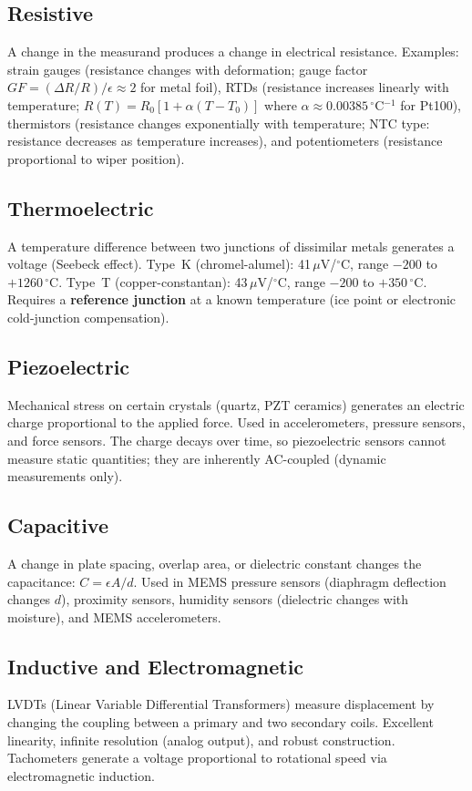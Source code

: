 \documentclass[11pt,letterpaper,twoside,openany]{book}
\newcommand{\degC}{\ensuremath{{}^{\circ}\text{C}}}
\begin{document}
\subsection{Resistive}
A change in the measurand produces a change in electrical resistance. Examples: strain gauges (resistance changes with deformation; gauge factor $GF = (\Delta R/R)/\epsilon \approx 2$ for metal foil), RTDs (resistance increases linearly with temperature; $R(T) = R_0[1 + \alpha(T - T_0)]$ where $\alpha \approx 0.00385$\,\degC{}$^{-1}$ for Pt100), thermistors (resistance changes exponentially with temperature; NTC type: resistance decreases as temperature increases), and potentiometers (resistance proportional to wiper position).

\subsection{Thermoelectric}
A temperature difference between two junctions of dissimilar metals generates a voltage (Seebeck effect). Type~K (chromel-alumel): 41\,$\mu$V/\degC{}, range $-200$ to $+1260$\,\degC{}. Type~T (copper-constantan): 43\,$\mu$V/\degC{}, range $-200$ to $+350$\,\degC{}. Requires a \textbf{reference junction} at a known temperature (ice point or electronic cold-junction compensation).

\subsection{Piezoelectric}
Mechanical stress on certain crystals (quartz, PZT ceramics) generates an electric charge proportional to the applied force. Used in accelerometers, pressure sensors, and force sensors. The charge decays over time, so piezoelectric sensors cannot measure static quantities; they are inherently AC-coupled (dynamic measurements only).

\subsection{Capacitive}
A change in plate spacing, overlap area, or dielectric constant changes the capacitance: $C = \epsilon A / d$. Used in MEMS pressure sensors (diaphragm deflection changes $d$), proximity sensors, humidity sensors (dielectric changes with moisture), and MEMS accelerometers.

\subsection{Inductive and Electromagnetic}
LVDTs (Linear Variable Differential Transformers) measure displacement by changing the coupling between a primary and two secondary coils. Excellent linearity, infinite resolution (analog output), and robust construction. Tachometers generate a voltage proportional to rotational speed via electromagnetic induction.
\end{document}
